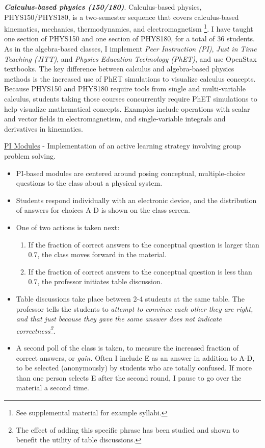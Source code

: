 \documentclass[../../../main.tex]{subfiles}
\begin{document}
\textbf{\textit{Calculus-based physics (150/180)}}. Calculus-based physics, PHYS150/PHYS180, is a two-semester sequence that covers calculus-based kinematics, mechanics, thermodynamics, and electromagnetism \footnote{See supplemental material for example syllabi.}.  I have taught one section of PHYS150 and one section of PHYS180, for a total of 36 students.  As in the algebra-based classes, I implement \textit{Peer Instruction (PI)}, \textit{Just in Time Teaching (JITT)}, and \textit{Physics Education Technology (PhET)}, and use OpenStax textbooks.  The key difference between calculus and algebra-based physics methods is the increased use of PhET simulations to visualize calculus concepts.  Because PHYS150 and PHYS180 require tools from single and multi-variable calculus, students taking those courses concurrently require PhET simulations to help visualize mathematical concepts.  Examples include operations with scalar and vector fields in electromagnetism, and single-variable integrals and derivatives in kinematics. \\ \hspace{0.1cm}

\underline{PI Modules} - Implementation of an active learning strategy involving group problem solving.
\begin{itemize}
\item PI-based modules are centered around posing conceptual, multiple-choice questions to the class about a physical system.  
\item Students respond individually with an electronic device, and the distribution of answers for choices A-D is shown on the class screen.
\item One of two actions is taken next:
\begin{enumerate}
\item If the fraction of correct answers to the conceptual question is larger than 0.7, the class moves forward in the material.
\item If the fraction of correct answers to the conceptual question is less than 0.7, the professor initiates table discussion.
\end{enumerate}
\item Table discussions take place between 2-4 students at the same table.  The professor tells the students to \textit{attempt to convince each other they are right, and that just because they gave the same answer does not indicate correctness\footnote{The effect of adding this specific phrase has been studied and shown to benefit the utility of table discussions.}.}
\item A second poll of the class is taken, to measure the increased fraction of correct answers, or \textit{gain.} Often I include E as an answer in addition to A-D, to be selected (anonymously) by students who are totally confused.  If more than one person selects E after the second round, I pause to go over the material a second time.
\end{itemize}
\end{document}
